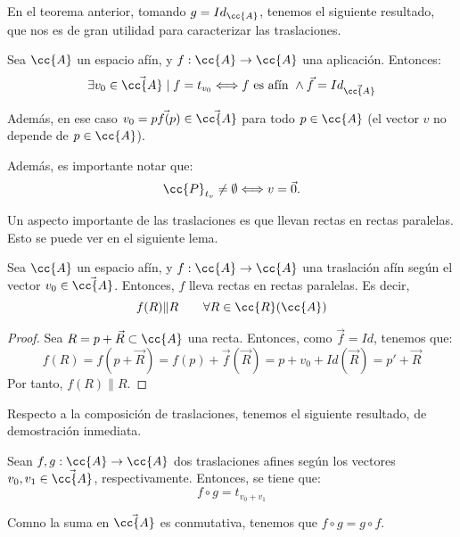 En el teorema anterior, tomando $g=Id_{\cc{A}}$, tenemos el siguiente resultado, que nos es de gran utilidad para caracterizar las traslaciones.
\begin{coro}
    Sea $\cc{A}$ un espacio afín, y $f:\cc{A}\to \cc{A}$ una aplicación. Entonces:
    \begin{equation*}
        \exists v_0\in \vec{\cc{A}}\mid f=t_{v_0} \Longleftrightarrow f\text{ es afín }\land \vec{f}=Id_{\vec{\cc{A}}} 
    \end{equation*}

    Además, en ese caso $v_0=\vec{pf(p)}\in \vec{\cc{A}}$ para todo $p\in \cc{A}$ (el vector $v$ no depende de $p\in \cc{A}$).
\end{coro}

Además, es importante notar que:
\begin{equation*}
    \cc{P}_{t_v}\neq \emptyset \Longleftrightarrow v=\vec{0}.
\end{equation*}

Un aspecto importante de las traslaciones es que llevan rectas en rectas paralelas. Esto se puede ver en el siguiente lema.
\begin{lema}
    Sea $\cc{A}$ un espacio afín, y $f:\cc{A}\to \cc{A}$ una traslación afín según el vector $v_0\in \vec{\cc{A}}$. Entonces, $f$ lleva rectas en rectas paralelas. Es decir,
    \begin{equation*}
        f(R)\| R \qquad \forall R\in \cc{R}(\cc{A})
    \end{equation*}
\end{lema}
\begin{proof}
    Sea $R=p+\vec{R}\subset \cc{A}$ una recta. Entonces, como $\vec{f}=Id$, tenemos que:
    \begin{equation*}
        f(R) = f(p+\vec{R}) = f(p) + \vec{f}(\vec{R}) = p+v_0 + Id(\vec{R}) = p' + \vec{R}
    \end{equation*}
    Por tanto, $f(R)\| R$.
\end{proof}

Respecto a la composición de traslaciones, tenemos el siguiente resultado, de demostración inmediata.
\begin{lema}
    Sean $f,g:\cc{A}\to \cc{A}$ dos traslaciones afines según los vectores $v_0,v_1\in \vec{\cc{A}}$, respectivamente. Entonces, se tiene que:
    \begin{equation*}
        f\circ g = t_{v_0+v_1}
    \end{equation*}
\end{lema}
Comno la suma en $\vec{\cc{A}}$ es conmutativa, tenemos que $f\circ g = g\circ f$.

